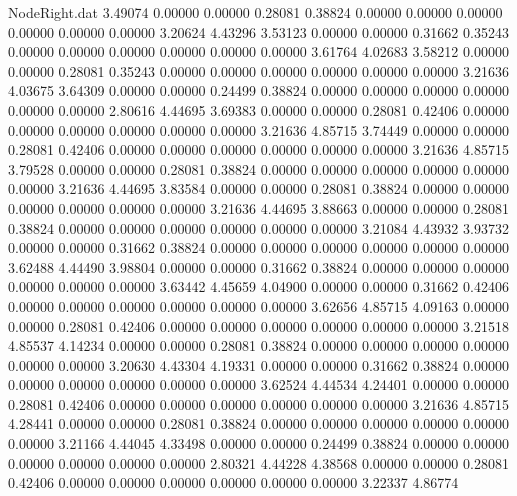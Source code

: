 \begin{filecontents}{NodeRight.dat}
   3.49074    0.00000    0.00000     0.28081    0.38824    0.00000    0.00000    0.00000    0.00000    0.00000    0.00000    3.20624    4.43296
   3.53123    0.00000    0.00000     0.31662    0.35243    0.00000    0.00000    0.00000    0.00000    0.00000    0.00000    3.61764    4.02683
   3.58212    0.00000    0.00000     0.28081    0.35243    0.00000    0.00000    0.00000    0.00000    0.00000    0.00000    3.21636    4.03675
   3.64309    0.00000    0.00000     0.24499    0.38824    0.00000    0.00000    0.00000    0.00000    0.00000    0.00000    2.80616    4.44695
   3.69383    0.00000    0.00000     0.28081    0.42406    0.00000    0.00000    0.00000    0.00000    0.00000    0.00000    3.21636    4.85715
   3.74449    0.00000    0.00000     0.28081    0.42406    0.00000    0.00000    0.00000    0.00000    0.00000    0.00000    3.21636    4.85715
   3.79528    0.00000    0.00000     0.28081    0.38824    0.00000    0.00000    0.00000    0.00000    0.00000    0.00000    3.21636    4.44695
   3.83584    0.00000    0.00000     0.28081    0.38824    0.00000    0.00000    0.00000    0.00000    0.00000    0.00000    3.21636    4.44695
   3.88663    0.00000    0.00000     0.28081    0.38824    0.00000    0.00000    0.00000    0.00000    0.00000    0.00000    3.21084    4.43932
   3.93732    0.00000    0.00000     0.31662    0.38824    0.00000    0.00000    0.00000    0.00000    0.00000    0.00000    3.62488    4.44490
   3.98804    0.00000    0.00000     0.31662    0.38824    0.00000    0.00000    0.00000    0.00000    0.00000    0.00000    3.63442    4.45659
   4.04900    0.00000    0.00000     0.31662    0.42406    0.00000    0.00000    0.00000    0.00000    0.00000    0.00000    3.62656    4.85715
   4.09163    0.00000    0.00000     0.28081    0.42406    0.00000    0.00000    0.00000    0.00000    0.00000    0.00000    3.21518    4.85537
   4.14234    0.00000    0.00000     0.28081    0.38824    0.00000    0.00000    0.00000    0.00000    0.00000    0.00000    3.20630    4.43304
   4.19331    0.00000    0.00000     0.31662    0.38824    0.00000    0.00000    0.00000    0.00000    0.00000    0.00000    3.62524    4.44534
   4.24401    0.00000    0.00000     0.28081    0.42406    0.00000    0.00000    0.00000    0.00000    0.00000    0.00000    3.21636    4.85715
   4.28441    0.00000    0.00000     0.28081    0.38824    0.00000    0.00000    0.00000    0.00000    0.00000    0.00000    3.21166    4.44045
   4.33498    0.00000    0.00000     0.24499    0.38824    0.00000    0.00000    0.00000    0.00000    0.00000    0.00000    2.80321    4.44228
   4.38568    0.00000    0.00000     0.28081    0.42406    0.00000    0.00000    0.00000    0.00000    0.00000    0.00000    3.22337    4.86774

\end{filecontents}
